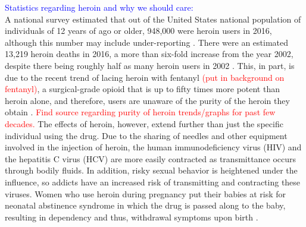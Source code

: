 \documentclass[12pt]{article}
\begin{document}
\textcolor{blue}{Statistics regarding heroin and why we should care:} \\
A national survey estimated that out of the United States national population of individuals of 12 years of ago or older, 948,000 were heroin users in 2016, although this number may include under-reporting \cite{CDC2}. There were an estimated 13,219 heroin deaths in 2016, a more than six-fold increase from the year 2002, despite there being roughly half as many heroin users in 2002 \cite{NSDUH1}. This, in part, is due to the recent trend of lacing heroin with fentanyl \textcolor{red}{(put in background on fentanyl)}, a surgical-grade opioid that is up to fifty times more potent than heroin alone, and therefore, users are unaware of the purity of the heroin they obtain \cite{CDC1, NIH2, Volkow2}. \textcolor{red}{Find source regarding purity of heroin trends/graphs for past few decades.} The effects of heroin, however, extend further than just the specific individual using the drug. Due to the sharing of needles and other equipment involved in the injection of heroin, the human immunodeficiency virus (HIV) and the hepatitis C virus (HCV) are more easily contracted as transmittance occurs through bodily fluids. In addition, risky sexual behavior is heightened under the influence, so addicts have an increased risk of transmitting and contracting these viruses. Women who use heroin during pregnancy put their babies at risk for neonatal abstinence syndrome in which the drug is passed along to the baby, resulting in dependency and thus, withdrawal symptoms upon birth \cite{NIDA2}. 
\end{document}

